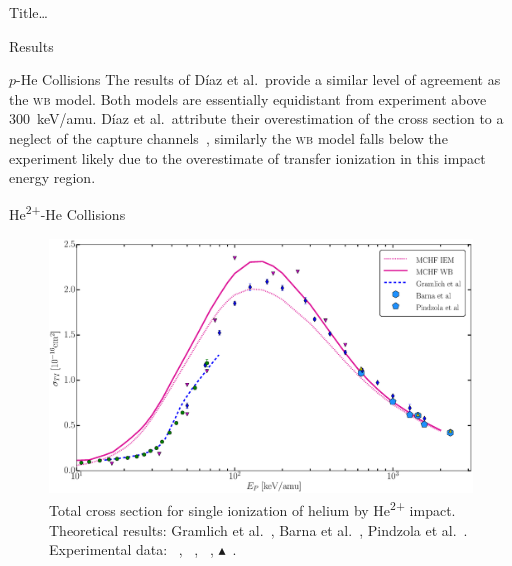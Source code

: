 \documentclass[letterpaper, 11 pt]{report}
\begin{document}
\begin{chapter}{ Title\dots \label{chap:p-he2p-he}}
\begin{section}{Results \label{sec:phe2p-res}}
\begin{subsection}{\texorpdfstring{$p$}{p}-He Collisions \label{sec:phe-res}}
         The results of D\'{i}az et al.\ provide a similar level of agreement as the \textsc{wb} model.
         Both models are essentially equidistant from experiment above 300~keV/amu. D\'{i}az
         et al.\ attribute their overestimation of the cross section to a neglect of the
         capture channels~\cite{DMS-00}, similarly the \textsc{wb} model falls below the experiment
         likely due to the overestimate of transfer ionization in this impact energy region.

      \end{subsection}

      \begin{subsection}{\texorpdfstring{He\textsuperscript{2+}}{He2+}-He Collisions 
                         \label{sec:he2phe-res}}

         \begin{figure}[t]
            \centering
            \includegraphics[width = 0.95 \linewidth]{./images/he2phe/he2phe-TI.eps}
            \caption[Total cross section for single ionization of helium by He\textsuperscript{2+}
                     impact.]{Total cross section for single ionization of helium by
                     He\textsuperscript{2+} impact. Theoretical results: Gramlich
                     et al.~\cite{GGS-89}, Barna
                     et al.~\cite{BTB-05}, Pindzola et al.~\cite{PRC-07}.
                     Experimental data: {\color{blue}{$\blacklozenge$}}~\cite{SG85},
                     {\color{OliveGreen}{$\bullet$}}~\cite{SG89},
                     {\color{RedViolet}{$\blacktriangledown$}}~\cite{Dubois87},
                     {\color{GreenYellow}$\blacktriangle$}~\cite{KAH84}. \label{fig:he2phe-ti}}
         \end{figure}


\end{subsection}
\end{section}
\end{chapter}
\end{document}
